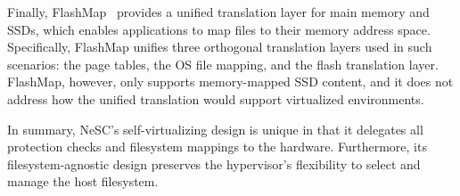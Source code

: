 Finally, FlashMap~\cite{huang2015unified} provides a unified translation layer for main memory and SSDs, which enables applications to map files to their memory address space. Specifically, FlashMap unifies three orthogonal translation layers used in such scenarios: the page tables, the OS file mapping, and the flash translation layer.
FlashMap, however, only supports memory-mapped SSD content, and it does not address how the unified translation would support virtualized environments.

In summary, NeSC's self-virtualizing design is unique in that it delegates all protection checks and filesystem mappings to the hardware. Furthermore, its  filesystem-agnostic design preserves the hypervisor's flexibility to select and manage the host filesystem.





